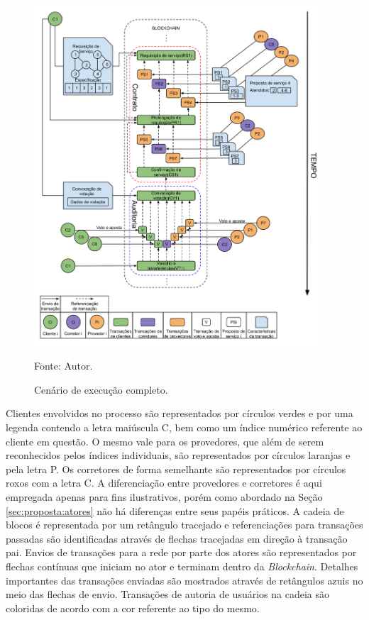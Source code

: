 \begin{figure}[ht!]
\caption{Cenário de execução completo.}
\centering
\includegraphics[width=0.96\textwidth]{imagens/cenario_execucao.png}
\begin{center}
        Fonte: Autor.
\end{center}
\label{fig:cenario_execucao}
\end{figure}


Clientes envolvidos no processo são representados por círculos verdes e por uma legenda contendo a letra maiúscula C, bem como um índice numérico referente ao cliente em questão. O mesmo vale para os provedores, que além de serem reconhecidos pelos índices individuais, são representados por círculos laranjas e pela letra P. Os corretores de forma semelhante são representados por círculos roxos com a letra C. A diferenciação entre provedores e corretores é aqui empregada apenas para fins ilustrativos, porém como abordado na Seção \ref{sec:proposta:atores} não há diferenças entre seus papéis práticos. A cadeia de blocos é representada por um retângulo tracejado e referenciações para transações passadas são identificadas através de flechas tracejadas em direção à transação pai. Envios de transações para a rede por parte dos atores são representados por flechas contínuas que iniciam no ator e terminam dentro da \textit{Blockchain}. Detalhes importantes das transações enviadas são mostrados através de retângulos azuis no meio das flechas de envio. Transações de autoria de usuários na cadeia são coloridas de acordo com a cor referente ao tipo do mesmo. 

